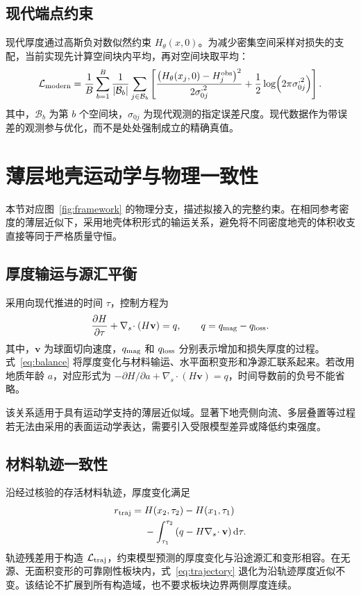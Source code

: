 \documentclass[UTF8,zihao=-4,fontset=none,a4paper]{ctexart}
\newcommand{\dif}{\mathop{}\!\mathrm{d}}
\newcommand{\divs}{\nabla_s\!\cdot}
\newcommand{\loss}{\mathcal{L}}
\begin{document}
\subsection{现代端点约束}

现代厚度通过高斯负对数似然约束 $H_\theta(x,0)$。为减少密集空间采样对损失的支配，当前实现先计算空间块内平均，再对空间块取平均：
\begin{equation}
  \loss_{\rm modern}
  =\frac{1}{B}\sum_{b=1}^{B}\frac{1}{|\mathcal B_b|}
  \sum_{j\in\mathcal B_b}
  \left[
    \frac{\big(H_\theta(x_j,0)-H_j^{\rm obs}\big)^2}{2\sigma_{0j}^{,2}}
    +\frac{1}{2}\log\!\left(2\pi\sigma_{0j}^{,2}\right)
  \right].
  \label{eq:modern}
\end{equation}
其中，$\mathcal B_b$ 为第 $b$ 个空间块，$\sigma_{0j}$ 为现代观测的指定误差尺度。现代数据作为带误差的观测参与优化，而不是处处强制成立的精确真值。

\section{薄层地壳运动学与物理一致性}

本节对应图~\ref{fig:framework} 的物理分支，描述拟接入的完整约束。在相同参考密度的薄层近似下，采用地壳体积形式的输运关系，避免将不同密度地壳的体积收支直接等同于严格质量守恒。

\subsection{厚度输运与源汇平衡}

采用向现代推进的时间 $\tau$，控制方程为
\begin{equation}
  \frac{\partial H}{\partial\tau}
  +\divs(H\mathbf v)
  =q,\qquad q=q_{\rm mag}-q_{\rm loss}.
  \label{eq:balance}
\end{equation}
其中，$\mathbf v$ 为球面切向速度，$q_{\rm mag}$ 和 $q_{\rm loss}$ 分别表示增加和损失厚度的过程。式~\eqref{eq:balance} 将厚度变化与材料输运、水平面积变形和净源汇联系起来。若改用地质年龄 $a$，对应形式为 $-\partial H/\partial a+\divs(H\mathbf v)=q$，时间导数前的负号不能省略。

该关系适用于具有运动学支持的薄层近似域。显著下地壳侧向流、多层叠置等过程若无法由采用的表面运动学表达，需要引入受限模型差异或降低约束强度。

\subsection{材料轨迹一致性}

沿经过核验的存活材料轨迹，厚度变化满足
\begin{equation}
  \begin{aligned}
  r_{\rm traj}={}&H(x_2,\tau_2)-H(x_1,\tau_1)\\
  &-\int_{\tau_1}^{\tau_2}
  \left(q-H\divs\mathbf v\right)\dif\tau .
  \end{aligned}
  \label{eq:trajectory}
\end{equation}
轨迹残差用于构造 $\loss_{\rm traj}$，约束模型预测的厚度变化与沿途源汇和变形相容。在无源、无面积变形的可靠刚性板块内，式~\eqref{eq:trajectory} 退化为沿轨迹厚度近似不变。该结论不扩展到所有构造域，也不要求板块边界两侧厚度连续。
\end{document}
